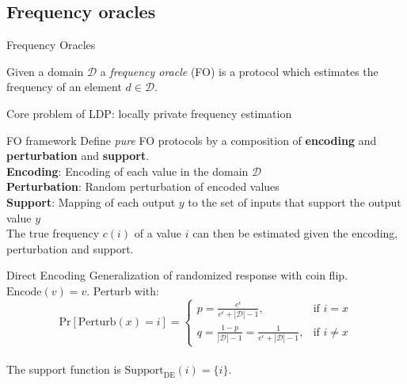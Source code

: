 \documentclass[aspectratio=43]{beamer}
\begin{document}
\subsection{Frequency oracles}

\begin{frame}{Frequency Oracles}
    \begin{definition}
        Given a domain $\mathcal{D}$ a \emph{frequency  oracle} (FO) is a protocol which estimates the frequency of an element $d \in \mathcal{D}$.
    \end{definition}
    \bigskip
    Core problem of LDP: locally private frequency estimation
\end{frame}


\begin{frame}{FO framework}
    Define \emph{pure} FO protocols by a composition of \textbf{encoding} and \textbf{perturbation} and \textbf{support}.\\
    \bigskip
    \textbf{Encoding}: Encoding of each value in the domain $\mathcal{D}$\\
    \bigskip
    \textbf{Perturbation}: Random perturbation of encoded values\\
    \bigskip
    \textbf{Support}: Mapping of each output $y$ to the set of inputs that support the output value $y$\\
    \bigskip
    The true frequency $c(i)$ of a value $i$ can then be estimated given the encoding, perturbation and support.
\end{frame}


\begin{frame}{Direct Encoding}
    Generalization of randomized response with coin flip.\\
    $\text{Encode}(v) = v$. Perturb with:
    \bigskip
    $$
    \text{Pr}[\text{Perturb}(x) = i] =
        \begin{cases}
            p = \frac{e^{\epsilon}}{e^{\epsilon}+|\mathcal{D}|-1}, & \text{if } i=x\\
            q = \frac{1-p}{|\mathcal{D}|-1} = \frac{1}{e^{\epsilon}+|\mathcal{D}|-1}, & \text{if } i \neq x
        \end{cases}
    $$\\
    \bigskip
    The support function is $\text{Support}_{\text{DE}}(i) = \{ i \}$.
\end{frame}
\end{document}
